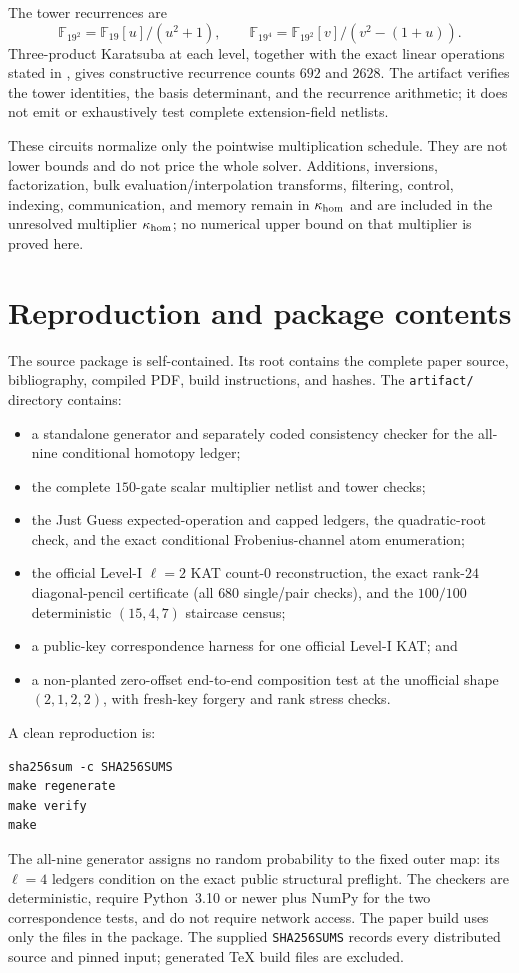 \documentclass[11pt]{article}
\newcommand{\F}{\mathbb F}
\begin{document}
The tower recurrences are
\[
 \F_{19^2}=\F_{19}[u]/(u^2+1),
 \qquad
 \F_{19^4}=\F_{19^2}[v]/(v^2-(1+u)).
\]
Three-product Karatsuba at each level, together with the exact linear
operations stated in , gives constructive recurrence
counts $692$ and $2628$.  The artifact verifies the tower identities, the
basis determinant, and the recurrence arithmetic; it does not emit or
exhaustively test complete extension-field netlists.

These circuits normalize only the pointwise multiplication schedule.  They
are not lower bounds and do not price the whole solver.  Additions,
inversions, factorization, bulk evaluation/interpolation transforms,
filtering, control,
indexing, communication, and memory remain in $\kappa_{\rm hom}$ and are
included in the unresolved multiplier $\kappa_{\rm hom}$; no numerical upper
bound on that multiplier is proved here.

\section{Reproduction and package contents}\label{app:artifact}
The source package is self-contained.  Its root contains the complete paper
source, bibliography, compiled PDF, build instructions, and hashes.  The
\texttt{artifact/} directory contains:
\begin{itemize}
\item a standalone generator and separately coded consistency checker for the
      all-nine conditional homotopy ledger;
\item the complete $150$-gate scalar multiplier netlist and tower checks;
\item the Just Guess expected-operation and capped ledgers, the quadratic-root
      check, and the exact conditional Frobenius-channel atom enumeration;
\item the official Level-I $\ell=2$ KAT count-$0$ reconstruction, the exact
      rank-$24$ diagonal-pencil certificate (all $680$ single/pair checks), and
      the $100/100$ deterministic $(15,4,7)$ staircase census;
\item a public-key correspondence harness for one official Level-I KAT; and
\item a non-planted zero-offset end-to-end composition test at the unofficial
      shape $(2,1,2,2)$, with fresh-key forgery and rank stress checks.
\end{itemize}

A clean reproduction is:
\begin{verbatim}
sha256sum -c SHA256SUMS
make regenerate
make verify
make
\end{verbatim}
The all-nine generator assigns no random probability to the fixed outer map:
its $\ell=4$ ledgers condition on the exact public structural preflight.  The
checkers are deterministic, require Python~3.10 or newer plus NumPy for the two
correspondence tests, and do not require network access.  The paper build uses
only the files in the package.  The supplied \texttt{SHA256SUMS} records every
distributed source and pinned input; generated TeX build files are excluded.
\end{document}

